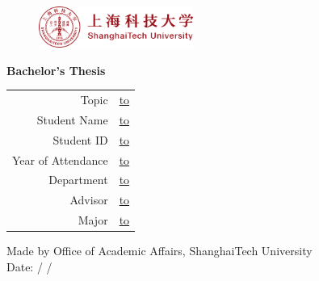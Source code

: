 \thispagestyle{titlepage}

\begin{figure}[!htb]
\includegraphics[width=0.45\textwidth]{style-files/emblem.pdf}
\end{figure}

\vspace{3cm}
\begin{center}
\Huge\sffamily\textbf{Bachelor's Thesis}
\end{center}
\vfill

\vspace{3cm}

{\def\arraystretch{1.5}
\makeatletter
  \begin{tabular}{Cc}
  Topic&
  \underline{\hbox to \@metaBlankLen{\hfill\@title\hfill}} \\
  Student Name&
  \underline{\hbox to \@metaBlankLen{\hfill\@studentNameEn\hfill}} \\
  Student ID&
  \underline{\hbox to \@metaBlankLen{\hfill\@studentId\hfill}} \\
  Year of Attendance&
  \underline{\hbox to \@metaBlankLen{\hfill\@yearOfAttendance\hfill}} \\
  Department&
  \underline{\hbox to \@metaBlankLen{\hfill\@departmentNameEn\hfill}} \\
  Advisor&
  \underline{\hbox to \@metaBlankLen{\hfill\@advisorNameEn\hfill}} \\
  Major&
  \underline{\hbox to \@metaBlankLen{\hfill\@majorNameEn\hfill}} \\
  \end{tabular}
\makeatother}

\vfill

\begin{center}
Made by Office of Academic Affairs, ShanghaiTech University\\
Date: \quad / \quad /
\end{center}

\clearpage